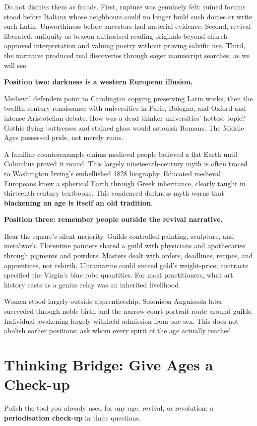 Do not dismiss them as frauds. First, rupture was genuinely felt: ruined forums stood before Italians whose neighbours could no longer build such domes or write such Latin. Unworthiness before ancestors had material evidence. Second, revival liberated: antiquity as beacon authorised reading originals beyond church-approved interpretation and valuing poetry without proving salvific use. Third, the narrative produced real discoveries through eager manuscript searches, as we will see.

\textbf{Position two: darkness is a western European illusion.}

Medieval defenders point to Carolingian copying preserving Latin works, then the twelfth-century renaissance with universities in Paris, Bologna, and Oxford and intense Aristotelian debate. How was a dead thinker universities' hottest topic? Gothic flying buttresses and stained glass would astonish Romans. The Middle Ages possessed pride, not merely ruins.

A familiar counterexample claims medieval people believed a flat Earth until Columbus proved it round. This largely nineteenth-century myth is often traced to Washington Irving's embellished 1828 biography. Educated medieval Europeans knew a spherical Earth through Greek inheritance, clearly taught in thirteenth-century textbooks. This condensed darkness myth warns that \textbf{blackening an age is itself an old tradition}.

\textbf{Position three: remember people outside the revival narrative.}

Hear the square's silent majority. Guilds controlled painting, sculpture, and metalwork. Florentine painters shared a guild with physicians and apothecaries through pigments and powders. Masters dealt with orders, deadlines, recipes, and apprentices, not rebirth. Ultramarine could exceed gold's weight-price; contracts specified the Virgin's blue robe quantities. For most practitioners, what art history casts as a genius relay was an inherited livelihood.

Women stood largely outside apprenticeship. Sofonisba Anguissola later succeeded through noble birth and the narrow court-portrait route around guilds. Individual awakening largely withheld admission from one sex. This does not abolish earlier positions; ask whom every spirit of the age actually reached.

\section[Thinking Bridge: Check Period Names]{Thinking Bridge: Give Ages a Check-up}
Polish the tool you already used for any age, revival, or revolution: a \textbf{periodisation check-up} in three questions.

